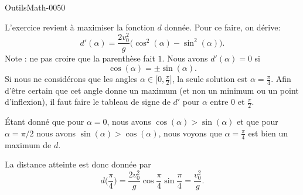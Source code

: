 
\begin{corrige}{OutilsMath-0050}

    L'exercice revient à maximiser la fonction $d$ donnée. Pour ce faire, on dérive:
    \begin{equation}
        d'(\alpha)=\frac{ 2v_0^2 }{ g }\big( \cos^2(\alpha)-\sin^2(\alpha) \big).
    \end{equation}
    Note : ne pas croire que la parenthèse fait $1$. Nous avons $d'(\alpha)=0$ si
    \begin{equation}
        \cos(\alpha)=\pm\sin(\alpha).
    \end{equation}
    Si nous ne considérons que les angles $\alpha\in\mathopen[ 0 , \frac{ \pi }{ 2 } \mathclose]$, la seule solution est $\alpha=\frac{ \pi }{ 4 }$.  Afin d'être certain que cet angle donne un maximum (et non un minimum ou un point d'inflexion), il faut faire le tableau de signe de $d'$ pour $\alpha$ entre $0$ et $\frac{ \pi }{2}$.

    Étant donné que pour $\alpha=0$, nous avons $\cos(\alpha)>\sin(\alpha)$ et que pour $\alpha=\pi/2$ nous avons $\sin(\alpha)>\cos(\alpha)$, nous voyons que $\alpha=\frac{ \pi }{ 4 }$ est bien un maximum de $d$.

    La distance atteinte est donc donnée par
    \begin{equation}
        d\big( \frac{ \pi }{ 4 } \big)=\frac{ 2v_0^2 }{ g }\cos\frac{ \pi }{ 4 }\sin\frac{ \pi }{ 4 }=\frac{ v_0^2 }{ g }.
    \end{equation}

\end{corrige}
